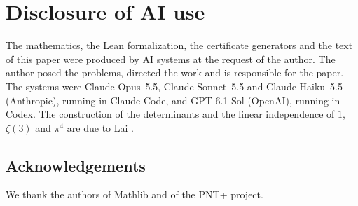 \documentclass[11pt]{amsart}
\theoremstyle{definition}
\theoremstyle{remark}
\numberwithin{equation}{section}
\begin{document}
\section*{Disclosure of AI use}
The mathematics, the Lean formalization, the certificate generators and the text of this paper were produced by AI
systems at the request of the author. The author posed the problems, directed the work and is responsible for the
paper. The systems were Claude Opus~5.5, Claude Sonnet~5.5 and Claude Haiku~5.5 (Anthropic), running in Claude Code,
and GPT-6.1 Sol (OpenAI), running in Codex. The construction of the determinants and the linear independence of $1$,
$\zeta(3)$ and $\pi^4$ are due to Lai \cite{Lai2026}.

\subsection*{Acknowledgements}
We thank the authors of Mathlib and of the PNT+ project.
\end{document}
